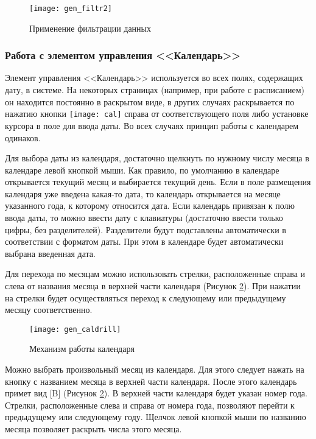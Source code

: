 \begin{figure}[!ht]\centering
	\texttt{[image: gen\_filtr2]}
	\caption{Применение фильтрации данных}
	\label{img_gen_filtr2}
\end{figure}  

\subsubsection{Работа с элементом управления <<Календарь>>} \label{gen_cal}

Элемент управления <<Календарь>> используется во всех полях, содержащих дату, в системе. На некоторых страницах (например, при работе с расписанием) он находится постоянно в раскрытом виде, в других случаях раскрывается по нажатию кнопки \texttt{[image: cal]} справа от соответствующего поля либо установке курсора в поле для ввода даты. Во всех случаях принцип работы с календарем одинаков.

Для выбора даты из календаря, достаточно щелкнуть по нужному числу месяца в календаре левой кнопкой мыши.  Как правило, по умолчанию в календаре открывается текущий месяц и выбирается текущий день. Если в поле размещения календаря уже введена какая-то дата, то календарь открывается на месяце указанного года, к которому относится дата. Если календарь привязан к полю ввода даты, то можно ввести дату с клавиатуры (достаточно ввести только цифры, без разделителей). Разделители будут подставлены автоматически в соответствии с форматом даты. При этом в календаре будет автоматически выбрана введенная дата.

Для перехода по месяцам можно использовать стрелки, расположенные справа и слева от названия месяца в верхней части календаря (Рисунок \ref{img_gen_caldrill}). При нажатии на стрелки будет осуществляться переход к следующему или предыдущему месяцу соответственно.

\begin{figure}[!ht]\centering
	\texttt{[image: gen\_caldrill]}
	\caption{Механизм работы календаря}
	\label{img_gen_caldrill}
\end{figure} 

Можно выбрать произвольный месяц из календаря. Для этого следует нажать на кнопку с названием месяца в верхней части календаря. После этого календарь примет вид [B] (Рисунок \ref{img_gen_caldrill}). В верхней части календаря будет указан номер года. Стрелки, расположенные слева и справа от номера года, позволяют перейти к предыдущему или следующему году. Щелчок левой кнопкой мыши по названию месяца позволяет раскрыть числа этого месяца.


